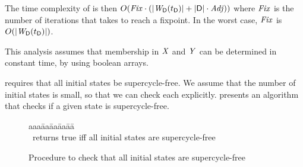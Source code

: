 The time complexity of \cLFP{$\DS, \tD$} is then $O(\mathit{Fix} \cdot (|\mathit{W}_{\mathsf{D}}({t_\mathsf{D}})| + |\mathsf{D}| \cdot \mathit{Adj}))$
where $\mathit{Fix}$ is the number of iterations that  \cLFP{$\DS, \tD$} takes to reach a fixpoint. In the worst case, 
$\mathit{Fix}$ is $O(|\mathit{W}_{\mathsf{D}}({t_\mathsf{D}})|)$.

This analysis assumes that membership in $\mathit{X}$ and $\mathit{Y}$ can be determined in constant time, \eg by using boolean arrays.




 requires that all initial states be supercycle-free. 
We assume that the number of initial states is small, so that we can check each explicitly. 
  presents an algorithm that checks if a
given state is supercycle-free.

   \label{s:initSCFree}
%   


\begin{figure}[ht]
\setcounter{lctr}{0}
\begin{tabbing}\label{alg:compute-scViol}
aaa\= aa\= aa\= aa\= aa\=\kill
{}\\
\cmnt\ returns true iff all initial states are supercycle-free\\
\lio{\ENDFOR;}
\end{tabbing}
\caption{Procedure to check that all initial states are supercycle-free}
\label{fig:checkInitSCFree}
\end{figure}


